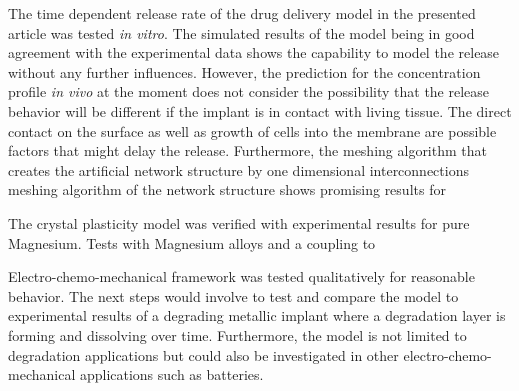 
The time dependent release rate of the drug delivery model in the presented article was tested \textit{in vitro}. The simulated results of the model being in good agreement with the experimental data shows the capability to model the release without any further influences. However, the prediction for the concentration profile \textit{in vivo} at the moment does not consider the possibility that the release behavior will be different if the implant is in contact with living tissue. The direct contact on the surface as well as growth of cells into the membrane are possible factors that might delay the release. Furthermore, the meshing algorithm that creates the artificial network structure by one dimensional interconnections meshing algorithm of the network structure shows promising results for 

The crystal plasticity model was verified with experimental results for pure Magnesium. Tests with Magnesium alloys and a coupling to 

Electro-chemo-mechanical framework was tested qualitatively for reasonable behavior. The next steps would involve to test and compare the model to experimental results of a degrading metallic implant where a degradation layer is forming and dissolving over time. Furthermore, the model is not limited to degradation applications but could also be investigated in other electro-chemo-mechanical applications such as batteries. 